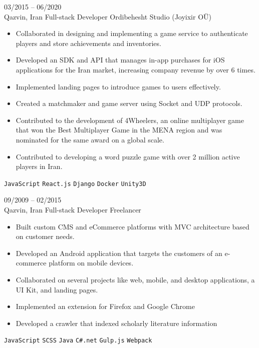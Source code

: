 \documentclass[8pt]{developercv} %
\begin{document}
\begin{entrylist}
        \entry
        {03/2015 -- 06/2020 \\ Qazvin, Iran}
        {Full-stack Developer}
        {Ordibehesht Studio {\small (Joyixir OÜ)}}
        {\vspace{-10pt}
            \begin{itemize}[noitemsep,topsep=0pt,parsep=0pt,partopsep=0pt, leftmargin=-1pt]
                \item Collaborated in designing and implementing a game service to authenticate players and store achievements and inventories.
                \item Developed an SDK and API that manages in-app purchases for iOS applications for the Iran market, increasing company revenue by over 6 times.
                \item Implemented landing pages to introduce games to users effectively.
                \item Created a matchmaker and game server using Socket and UDP protocols.
                \item Contributed to the development of 4Wheelers, an online multiplayer game that won the Best Multiplayer Game in the MENA region and was nominated for the same award on a global scale.
                \item Contributed to developing a word puzzle game with over 2 million active players in Iran.
            \end{itemize}
            \texttt{JavaScript} \slashsep \texttt{React.js} \slashsep \texttt{Django} \slashsep \texttt{Docker} \slashsep \texttt{Unity3D}
        }

        \entry
        {09/2009 -- 02/2015 \\ Qazvin, Iran}
        {Full-stack Developer}
        {Freelancer}
        {\vspace{-10pt}
            \begin{itemize}[noitemsep,topsep=0pt,parsep=0pt,partopsep=0pt, leftmargin=-1pt]
                \item Built custom CMS and eCommerce platforms with MVC architecture based on customer needs.
                \item Developed an Android application that targets the customers of an e-commerce platform on mobile devices.
                \item Collaborated on several projects like web, mobile, and desktop applications, a UI Kit, and landing pages.
                \item Implemented an extension for Firefox and Google Chrome
                \item Developed a crawler that indexed scholarly literature information
            \end{itemize}
            \texttt{JavaScript} \slashsep \texttt{SCSS} \slashsep \texttt{Java} \slashsep \texttt{C\#.net} \slashsep \texttt{Gulp.js} \slashsep \texttt{Webpack}
        }
    \end{entrylist}
\end{document}
